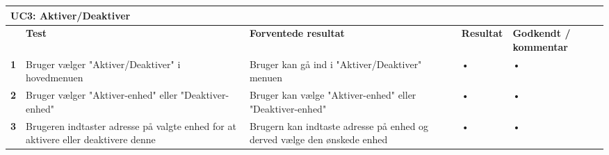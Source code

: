 
\begin{longtable}{|p{5mm}|p{40mm}|p{40mm}|p{20mm}|p{25mm}|}
\hline 
\multicolumn{5}{|l|}{\textbf{UC3: Aktiver/Deaktiver}} \\ 
\hline 
& \textbf{Test} & \textbf{Forventede resultat} & \textbf{Resultat} & \textbf{Godkendt / kommentar} \\ 
\hline 
\textbf{1}& Bruger vælger "Aktiver/Deaktiver" i hovedmenuen & Bruger kan gå ind i "Aktiver/Deaktiver" menuen & • & • \\ 
\hline 
\textbf{2}& Bruger vælger "Aktiver-enhed" eller "Deaktiver-enhed" & Bruger kan vælge "Aktiver-enhed" eller "Deaktiver-enhed" & • & • \\ 
\hline 
\textbf{3}& Brugeren indtaster adresse på valgte enhed for at aktivere eller deaktivere denne & Brugern kan indtaste adresse på enhed og derved vælge den ønskede enhed & • & • \\ 
\hline 
\end{longtable} 